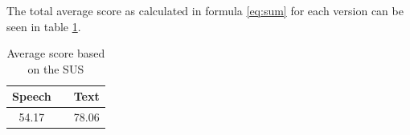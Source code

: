 The total average score as calculated in formula \ref{eq:sum} for each version can be seen in table \ref{tot_score}.
\begin{table}[ht]
  \centering
  \begin{tabular}{ccc}
    \toprule
    Speech &   & Text\\
    \midrule
    54.17 &   & 78.06\\
    \bottomrule
  \end{tabular}
  \caption{Average score based on the SUS}\label{tot_score}
\end{table}